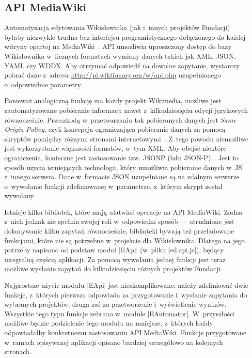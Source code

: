\subsection{API MediaWiki}
Automatyzacja edytowania Wikisłownika (jak i~innych projektów Fundacji) byłaby niezwykle trudna bez interfejsu programistycznego dołączonego do każdej witryny opartej na MediaWiki~\cite{mw:api}. API umożliwia uproszczony dostęp do bazy Wikisłownika w~licznych formatach wymiany danych takich jak XML, JSON, YAML czy WDDX. Aby otrzymać odpowiedź na dowolne zapytanie, wystarczy pobrać dane z~adresu \url{http://pl.wiktionary.org/w/api.php} uzupełnionego o~odpowiednie parametry.

Ponieważ analogiczną funkcję ma każdy projekt Wikimedia, możliwe jest zautomatyzowane pobieranie informacji nawet z~kilkudziesięciu edycji językowych równocześnie. Przeszkodą w~przetwarzaniu tak pobieranych danych jest \emph{Same Origin Policy}, czyli koncepcja ograniczająca pobieranie danych za pomocą skryptów pomiędzy różnymi stronami internetowymi~\cite{mozilla:sop}. Z~tego powodu niemożliwe jest wykorzystanie większości formatów, w~tym XML. Aby obejść niektóre ograniczenia, konieczne jest zastosowanie tzw. JSONP (lub: \hbox{JSON-P})~\cite{jsonp}. Jest to sposób użycia istniejących technologii, który umożliwia pobieranie danych w~JS z~innego serwera. Dane w~formacie JSON uzupełniane są na zdalnym serwerze o~wywołanie funkcji zdefiniowanej w~parametrze, z~którym skrypt został wywołany.

Istnieje kilka bibliotek, które mają ułatwiać operacje na API MediaWiki. Żadna z~nich jednak nie spełnia swojej roli w~odpowiedni sposób --- utrudnione jest dokonywanie kilku zapytań równocześnie, biblioteki bywają też przeładowane funkcjami, które nie są potrzebne w~projekcie dla Wikisłownika. Dlatego na jego potrzeby napisano od podstaw moduł \kod|EApi| (w~pliku \kod|ed.api.js|), będący integralną częścią aplikacji. Za pomocą wywołania jednej funkcji jest teraz możliwe wysłanie zapytań do kilkudziesięciu różnych projektów Fundacji.

Najprostsze użycie modułu \kod|EApi| jest nieskomplikowane: należy zdefiniować dwie funkcje, z~których pierwsza odpowiada za przygotowanie i~wysłanie zapytania do wybranych projektów, druga zaś za przetworzenie i~wyświetlenie wyników. Wszystkie tego typu funkcje zebrano w~module \kod|EAutomator|. W~przyszłości możliwe będzie podzielenie tego modułu na mniejsze, z~których każdy odpowiadałby konkretnemu zastosowaniu API MediaWiki. Funkcje przygotowane w~ramach opisywanej aplikacji opisano bardziej szczegółowo na kolejnych stronach.

